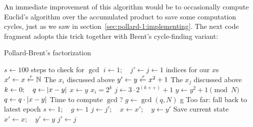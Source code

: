 An immediate improvement of this algorithm would be to occasionally compute Euclid's
algorithm over the accumulated product to save some computation cycles, just as
we saw in section~\ref{sec:pollard-1:implementing}. The next code fragment
adopts this trick together with Brent's cycle-finding variant:

\begin{algorithm}
  \caption{Pollard-Brent's factorization \label{alg:pollardrho}}
  \begin{algorithmic}[1]
    \State $s \gets 100$
    \Comment steps to check for $\gcd$
    \State $i \gets 1; \quad j' \gets j \gets 1$
    \Comment indices for our $x$s
    \State $x' \gets x \xleftarrow{r} \mathbb{N}$
    \Comment The $x_i$ discussed above
    \State $y' \gets y \xleftarrow{r} x^2 + 1$
    \Comment The $x_j$ discussed above
    \State $k \gets 0; \quad q \gets \left|x-y\right|$
      \State $x \gets y$ \Comment $x_i = 2^k$
      \State $j \gets 3 \cdot 2^{(k++)} + 1$
        \State $y \gets y^2 + 1 \pmod{N}$
        \State $q \gets q \cdot \left|x - y\right|$
         \Comment Time to compute $\gcd$?
          \State $g \gets \gcd(q, N)$
           \Return g \EndIf
            \Comment Too far: fall back to latest epoch
            \State $s \gets 1; \quad  g \gets 1$
            \State $j \gets j'; \quad x \gets x'; \quad y \gets y'$
          \Else
            \Comment Save current state
            \State $x' \gets x; \quad y' \gets y$
            \State $j' \gets j$
          \EndIf
        \EndIf
      \EndWhile
    \EndWhile
  \end{algorithmic}
\end{algorithm}

